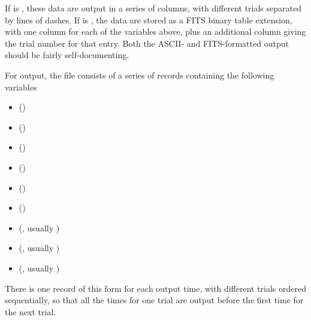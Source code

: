 \documentclass[letterpaper,10pt,english]{sphinxmanual}
\begin{document}
If  is , these data are output in a series of columns, with different trials separated by lines of dashes. If  is , the data are stored as a FITS binary table extension, with one column for each of the variables above, plus an additional column giving the trial number for that entry. Both the ASCII- and FITS-formatted output should be fairly self-documenting.

For  output, the file consists of a series of records containing the following variables
\begin{itemize}
\item {} 
 ()

\item {} 
 ()

\item {} 
 ()

\item {} 
 ()

\item {} 
 ()

\item {} 
 ()

\item {} 
 (, usually )

\item {} 
 (, usually )

\item {} 
 (, usually )

\end{itemize}

There is one record of this form for each output time, with different trials ordered sequentially, so that all the times for one trial are output before the first time for the next trial.
\end{document}
